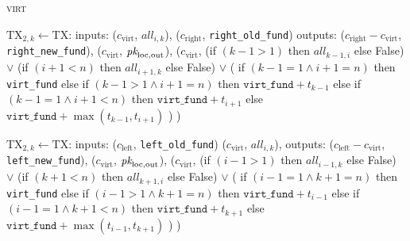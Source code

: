 \begin{center}
\begin{processbox}{\textsc{virt}}
\begin{algorithmic}[1]
         
          \State $\mathrm{TX}_{2, k} \gets \mathrm{TX}$:
          \Indent
            \State inputs:
            \Indent
              \State ($c_{\mathrm{virt}}$, $\mathit{all}_{i, k}$),
              \State ($c_{\mathrm{right}}$, \texttt{right\_old\_fund})
            \EndIndent
            \State outputs:
            \Indent
              \State ($c_{\mathrm{right}} - c_{\mathrm{virt}}$,
              \texttt{right\_new\_fund}),
              \State ($c_{\mathrm{virt}}$, $\textit{pk}_{\mathrm{loc}, \mathrm{out}}$),
              \State ($c_{\mathrm{virt}}$,
              \Indent
                \State (if $(k-1 > 1)$ then $\mathit{all}_{k-1, i}$ else False)
                \State $\vee$ (if $(i+1 < n)$ then $\mathit{all}_{i+1, k}$ else
                False)
                \State $\vee$ (
                \Indent
                  \State if $(k-1 = 1 \wedge i+1 = n)$ then \texttt{virt\_fund}
                  \State else if $(k-1 > 1 \wedge i+1 = n)$ then
                  $\texttt{virt\_fund} + t_{k-1}$
                  \State else if $(k-1 = 1 \wedge i+1 < n)$ then
                  $\texttt{virt\_fund} + t_{i+1}$
                  \State else 
                  $\texttt{virt\_fund} + \max{(t_{k-1}, t_{i+1})}$
                \EndIndent
                \State )
              \EndIndent
              \State )
            \EndIndent
          \EndIndent
        \EndFor

         
          \State $\mathrm{TX}_{2, k} \gets \mathrm{TX}$:
          \Indent
            \State inputs:
            \Indent
              \State ($c_{\mathrm{left}}$, \texttt{left\_old\_fund})
              \State ($c_{\mathrm{virt}}$, $\mathit{all}_{i, k}$),
            \EndIndent
            \State outputs:
            \Indent
              \State ($c_{\mathrm{left}} - c_{\mathrm{virt}}$,
              \texttt{left\_new\_fund}),
              \State ($c_{\mathrm{virt}}$, $\textit{pk}_{\mathrm{loc}, \mathrm{out}}$),
              \State ($c_{\mathrm{virt}}$,
              \Indent
                \State (if $(i-1 > 1)$ then $\mathit{all}_{i-1, k}$ else False)
                \State $\vee$ (if $(k+1 < n)$ then $\mathit{all}_{k+1, i}$ else
                False)
                \State $\vee$ (
                \Indent
                  \State if $(i-1 = 1 \wedge k+1 = n)$ then \texttt{virt\_fund}
                  \State else if $(i-1 > 1 \wedge k+1 = n)$ then
                  $\texttt{virt\_fund} + t_{i-1}$
                  \State else if $(i-1 = 1 \wedge k+1 < n)$ then
                  $\texttt{virt\_fund} + t_{k+1}$
                  \State else 
                  $\texttt{virt\_fund} + \max{(t_{i-1}, t_{k+1})}$
                \EndIndent
                \State )
              \EndIndent
              \State )
            \EndIndent
          \EndIndent
        \EndFor


\end{algorithmic}
\end{processbox}
\end{center}
